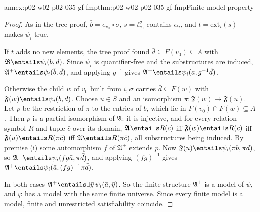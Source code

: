 \begin{annexitem}{annex:p02-w02-p02-035-gf-fmp}{thm:p02-w02-p02-035-gf-fmp}{Finite-model property}
\begin{proof}
As in the tree proof, \(\bar b=e_{v_0}\circ\sigma\), \(s=t_{v_0}^\sigma\)
contains \(\alpha_i\), and \(t=\mathrm{ext}_i(s)\) makes \(\psi_i\) true.

If \(t\) adds no new elements, the tree proof found
\(\bar d\subseteq F(v_0)\subseteq A\) with \(\mathfrak B\entails\psi_i(\bar b,\bar d)\).
Since \(\psi_i\) is quantifier-free and the substructures are induced,
\(\mathfrak A^{+}\entails\psi_i(\bar b,\bar d)\), and applying \(g^{-1}\) gives
\(\mathfrak A^{+}\entails\psi_i(\bar a,g^{-1}\bar d)\).

Otherwise the child \(w\) of \(v_0\) built from \(i,\sigma\) carries
\(\bar d\subseteq F(w)\) with \(\mathfrak F(w)\entails\psi_i(\bar b,\bar d)\).
Choose \(u\in S\) and an isomorphism \(\pi:\mathfrak F(w)\to\mathfrak F(u)\).
Let \(p\) be the restriction of \(\pi\) to the entries of \(\bar b\), which
lie in \(F(v_0)\cap F(w)\subseteq A\).  Then \(p\) is a partial isomorphism of
\(\mathfrak A\): it is injective, and for every relation symbol \(R\) and
tuple \(\bar c\) over its domain, \(\mathfrak A\entails R(\bar c)\) iff
\(\mathfrak F(w)\entails R(\bar c)\) iff \(\mathfrak F(u)\entails R(\pi\bar c)\)
iff \(\mathfrak A\entails R(\pi\bar c)\), all substructures being induced.
By premise (i) some automorphism \(f\) of \(\mathfrak A^{+}\) extends \(p\).
Now \(\mathfrak F(u)\entails\psi_i(\pi\bar b,\pi\bar d)\), so
\(\mathfrak A^{+}\entails\psi_i(f g\bar a,\pi\bar d)\), and applying
\((fg)^{-1}\) gives \(\mathfrak A^{+}\entails\psi_i(\bar a,(fg)^{-1}\pi\bar d)\).

In both cases \(\mathfrak A^{+}\entails\exists\bar y\,\psi_i(\bar a,\bar y)\).
So the finite structure \(\mathfrak A^{+}\) is a model of \(\psi\), and
\(\varphi\) has a model with the same finite universe.  Since every finite
model is a model, finite and unrestricted satisfiability coincide.
\end{proof}
\end{annexitem}

